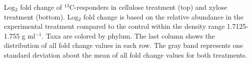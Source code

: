 Log$_{2}$ fold change of $^{13}$C-responders in cellulose
treatment (top) and xylose treatment (bottom).  Log$_{2}$ fold change is based
on the relative abundance in the experimental treatment compared to the control
within the density range 1.7125-1.755 g ml$^{-1}$. Taxa are
colored by phylum. The last column shows the distribution of all fold change values in each row. The gray band represents one standard deviation about the mean of all fold change values for both treatments.  

    